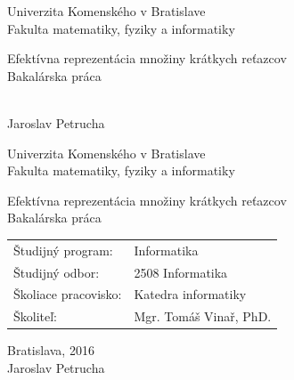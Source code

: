\documentclass[12pt, oneside]{book}
\def\mfrok{2016}
\def\mfnazov{Efektívna reprezentácia množiny krátkych reťazcov}
\def\mftyp{Bakalárska práca}
\def\mfautor{Jaroslav Petrucha}
\def\mfskolitel{Mgr. Tomáš Vinař, PhD. }
\def\mfkonzultant{tit. Meno Priezvisko, tit. }
\def\mfmiesto{Bratislava, \mfrok}
\def\mfodbor{2508 Informatika}
\def\program{ Informatika }
\def\mfpracovisko{ Katedra informatiky }
\begin{document}
     

\thispagestyle{empty}

\begin{center}
\sc\large
Univerzita Komenského v Bratislave\\
Fakulta matematiky, fyziky a informatiky

\vfill

{\LARGE\mfnazov}\\
\mftyp
\end{center}

\vfill

{\sc\large 
\noindent \mfrok\\
\mfautor
}

\eject %


\thispagestyle{empty}
\noindent

\begin{center}
\sc  
\large
Univerzita Komenského v Bratislave\\
Fakulta matematiky, fyziky a informatiky

\vfill

{\LARGE\mfnazov}\\
\mftyp
\end{center}

\vfill

\noindent
\begin{tabular}{ll}
Študijný program: & \program \\
Študijný odbor: & \mfodbor \\
Školiace pracovisko: & \mfpracovisko \\
Školiteľ: & \mfskolitel \\
\end{tabular}

\vfill


\noindent \mfmiesto\\
\mfautor

\eject %




\end{document}
